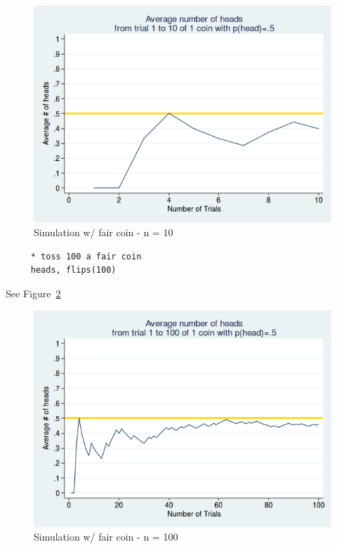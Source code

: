 \documentclass[11pt]{article}
\begin{document}
\begin{figure}[htp]
\centering
\includegraphics[scale=0.50]{coin_sim_10_fair.png}
\caption{Simulation w/ fair coin - n = 10}
\label{f1}
\end{figure}

	\begin{verbatim}
	 * toss 100 a fair coin
	 heads, flips(100)
	\end{verbatim}

See Figure~\ref{f2}\\

\begin{figure}[htp]
\centering
\includegraphics[scale=0.50]{coin_sim_100_fair.png}
\caption{Simulation w/ fair coin - n = 100}
\label{f2}
\end{figure}
	 
\end{document}
